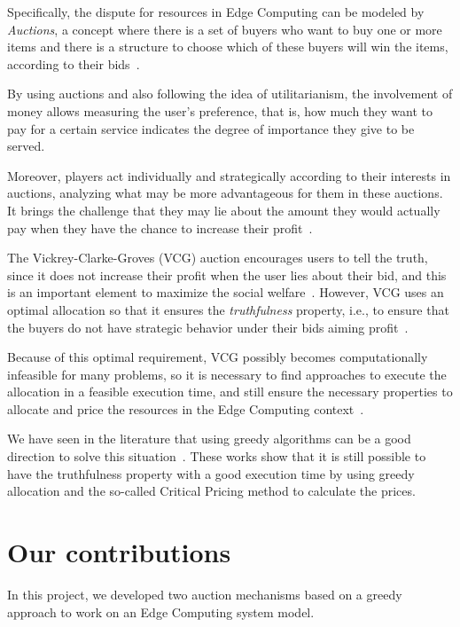 \documentclass[English]{ic-tese-v3}
\begin{document}
Specifically, the dispute for resources in Edge Computing can be modeled by \emph{Auctions}, a concept where there is a set of buyers who want to buy one or more items and there is a structure to choose which of these buyers will win the items, according to their bids~\cite{TimAGT2007}. 

By using auctions and also following the idea of utilitarianism, the involvement of money allows measuring the user's preference, that is, how much they want to pay for a certain service indicates the degree of importance they give to be served.

Moreover, players act individually and strategically according to their interests in auctions, analyzing what may be more advantageous for them in these auctions. It brings the challenge that they may lie about the amount they would actually pay when they have the chance to increase their profit~\cite{TimAGT2007, RafaelAGT2015}.

The Vickrey-Clarke-Groves (VCG) auction encourages users to tell the truth, since it does not increase their profit when the user lies about their bid, and this is an important element to maximize the social welfare~\cite{RafaelAGT2015, TimAGT2007}. However, VCG uses an optimal allocation so that it ensures the \emph{truthfulness} property, i.e., to ensure that the buyers do not have strategic behavior under their bids aiming profit~\cite{RafaelAGT2015, TimAGT2007}. 

Because of this optimal requirement, VCG possibly becomes computationally infeasible for many problems, so it is necessary to find approaches to execute the allocation in a feasible execution time, and still ensure the necessary properties to allocate and price the resources in the Edge Computing context~\cite{LiuStrategyProof2018}.

We have seen in the literature that using greedy algorithms can be a good direction to solve this situation~\cite{ChekuriTruthful2009,DeshiTruthful2020, LiuStrategyProof2018}. These works show that it is still possible to have the truthfulness property with a good execution time by using greedy allocation and the so-called Critical Pricing method to calculate the prices.

\section{Our contributions}
\label{sec:contributions}
In this project, we developed two auction mechanisms based on a greedy approach to work on an Edge Computing system model. 
\end{document}
